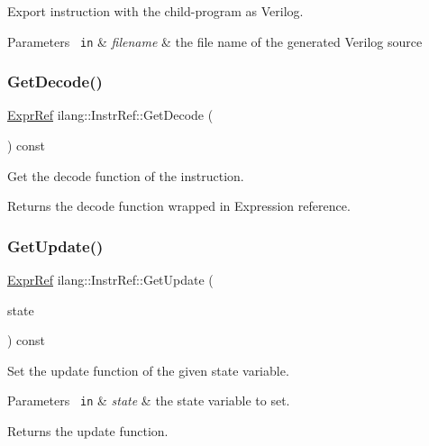 Export instruction with the child-\/program as Verilog. 


\begin{DoxyParams}[1]{Parameters}
\mbox{\texttt{ in}}  & {\em filename} & the file name of the generated Verilog source \\
\hline
\end{DoxyParams}
\mbox{\label{classilang_1_1_instr_ref_a0c28b811ca70252542fb7629fc71f643}} 
\subsubsection{\texorpdfstring{Get\+Decode()}{GetDecode()}}
{\footnotesize\ttfamily \mbox{\hyperlink{classilang_1_1_expr_ref}{Expr\+Ref}} ilang\+::\+Instr\+Ref\+::\+Get\+Decode (\begin{DoxyParamCaption}{ }\end{DoxyParamCaption}) const}



Get the decode function of the instruction. 

\begin{DoxyReturn}{Returns}
the decode function wrapped in Expression reference. 
\end{DoxyReturn}
\mbox{\label{classilang_1_1_instr_ref_ac149bb5581c5176642bac9585814de89}} 
\subsubsection{\texorpdfstring{Get\+Update()}{GetUpdate()}}
{\footnotesize\ttfamily \mbox{\hyperlink{classilang_1_1_expr_ref}{Expr\+Ref}} ilang\+::\+Instr\+Ref\+::\+Get\+Update (\begin{DoxyParamCaption}\item[{const \mbox{\hyperlink{classilang_1_1_expr_ref}{Expr\+Ref}} \&}]{state }\end{DoxyParamCaption}) const}



Set the update function of the given state variable. 


\begin{DoxyParams}[1]{Parameters}
\mbox{\texttt{ in}}  & {\em state} & the state variable to set. \\
\hline
\end{DoxyParams}
\begin{DoxyReturn}{Returns}
the update function. 
\end{DoxyReturn}
\mbox{\label{classilang_1_1_instr_ref_a5cfba90d3110e6a484fbef83a9f19c0e}} 

